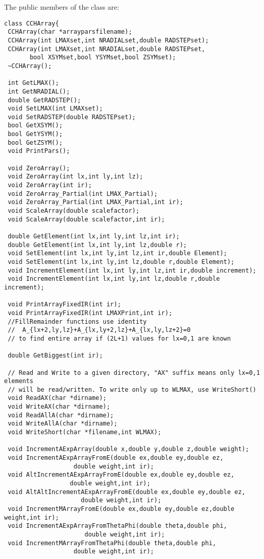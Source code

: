 \documentclass[10pt]{article}
\begin{document}
The public members of the class are:
\begin{verbatim}
class CCHArray{
 CCHArray(char *arrayparsfilename);
 CCHArray(int LMAXset,int NRADIALset,double RADSTEPset);
 CCHArray(int LMAXset,int NRADIALset,double RADSTEPset,
	   bool XSYMset,bool YSYMset,bool ZSYMset);
 ~CCHArray();

 int GetLMAX();
 int GetNRADIAL();
 double GetRADSTEP();
 void SetLMAX(int LMAXset);
 void SetRADSTEP(double RADSTEPset);
 bool GetXSYM();
 bool GetYSYM();
 bool GetZSYM();
 void PrintPars();

 void ZeroArray();
 void ZeroArray(int lx,int ly,int lz);
 void ZeroArray(int ir);
 void ZeroArray_Partial(int LMAX_Partial);
 void ZeroArray_Partial(int LMAX_Partial,int ir);
 void ScaleArray(double scalefactor);
 void ScaleArray(double scalefactor,int ir);

 double GetElement(int lx,int ly,int lz,int ir);
 double GetElement(int lx,int ly,int lz,double r);
 void SetElement(int lx,int ly,int lz,int ir,double Element);
 void SetElement(int lx,int ly,int lz,double r,double Element);
 void IncrementElement(int lx,int ly,int lz,int ir,double increment);
 void IncrementElement(int lx,int ly,int lz,double r,double increment);

 void PrintArrayFixedIR(int ir);
 void PrintArrayFixedIR(int LMAXPrint,int ir);
 //FillRemainder functions use identity
 //  A_{lx+2,ly,lz}+A_{lx,ly+2,lz}+A_{lx,ly,lz+2}=0
 // to find entire array if (2L+1) values for lx=0,1 are known

 double GetBiggest(int ir);

 // Read and Write to a given directory, "AX" suffix means only lx=0,1 elements
 // will be read/written. To write only up to WLMAX, use WriteShort()
 void ReadAX(char *dirname);
 void WriteAX(char *dirname);
 void ReadAllA(char *dirname);
 void WriteAllA(char *dirname);
 void WriteShort(char *filename,int WLMAX);

 void IncrementAExpArray(double x,double y,double z,double weight);
 void IncrementAExpArrayFromE(double ex,double ey,double ez,
			       double weight,int ir);
 void AltIncrementAExpArrayFromE(double ex,double ey,double ez,
				  double weight,int ir);
 void AltAltIncrementAExpArrayFromE(double ex,double ey,double ez,
				     double weight,int ir);
 void IncrementMArrayFromE(double ex,double ey,double ez,double weight,int ir);
 void IncrementAExpArrayFromThetaPhi(double theta,double phi,
				      double weight,int ir);
 void IncrementMArrayFromThetaPhi(double theta,double phi,
				   double weight,int ir);


\end{verbatim}
\end{document}
